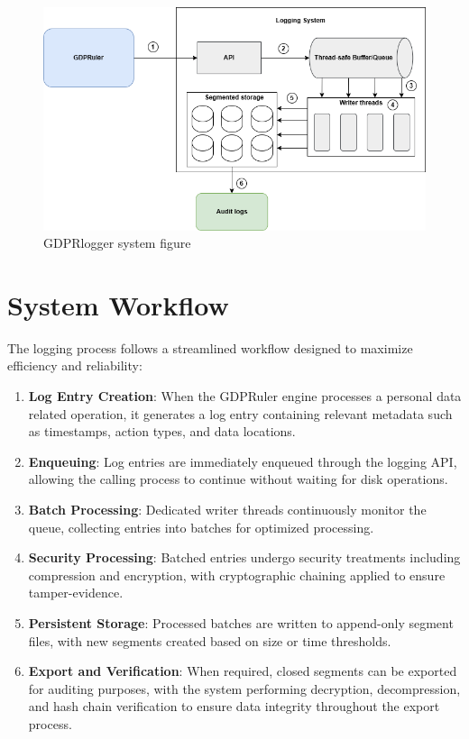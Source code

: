 \begin{figure}
    \centering
    \includegraphics[scale=0.4]{images/systemfigure.png}
    \caption{GDPRlogger system figure}
    \label{fig:systemfigure}
\end{figure}

\section{System Workflow}
The logging process follows a streamlined workflow designed to maximize efficiency and reliability:
\begin{enumerate}
    \item \textbf{Log Entry Creation}: When the GDPRuler engine processes a personal data related operation, it generates a log entry containing relevant metadata such as timestamps, action types, and data locations.
    \item \textbf{Enqueuing}: Log entries are immediately enqueued through the logging API, allowing the calling process to continue without waiting for disk operations.
    \item \textbf{Batch Processing}: Dedicated writer threads continuously monitor the queue, collecting entries into batches for optimized processing.
    \item \textbf{Security Processing}: Batched entries undergo security treatments including compression and encryption, with cryptographic chaining applied to ensure tamper-evidence.
    \item \textbf{Persistent Storage}: Processed batches are written to append-only segment files, with new segments created based on size or time thresholds.
    \item \textbf{Export and Verification}: When required, closed segments can be exported for auditing purposes, with the system performing decryption, decompression, and hash chain verification to ensure data integrity throughout the export process.
\end{enumerate}

